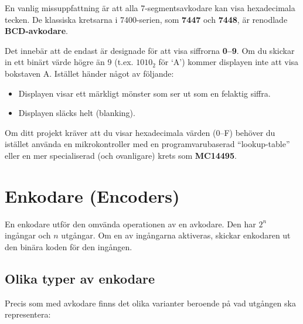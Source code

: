 \documentclass[
  swedish,
  letterpaper,
  oneside,
  openany]{book}
\providecommand{\tightlist}{%
  \setlength{\itemsep}{0pt}\setlength{\parskip}{0pt}}
\begin{document}
\begin{tcolorbox}[enhanced jigsaw, arc=.35mm, bottomrule=.15mm, bottomtitle=1mm, breakable, colback=white, colbacktitle=quarto-callout-warning-color!10!white, colframe=quarto-callout-warning-color-frame, coltitle=black, left=2mm, leftrule=.75mm, opacityback=0, opacitybacktitle=0.6, rightrule=.15mm, title=\textcolor{quarto-callout-warning-color}{\faExclamationTriangle}\hspace{0.5em}{Viktigt: 7447/7448 stöder inte Hexadecimala tal (A--F)}, titlerule=0mm, toprule=.15mm, toptitle=1mm]

En vanlig missuppfattning är att alla 7-segmentsavkodare kan visa
hexadecimala tecken. De klassiska kretsarna i 7400-serien, som
\textbf{7447} och \textbf{7448}, är renodlade \textbf{BCD-avkodare}.

Det innebär att de endast är designade för att visa siffrorna
\textbf{0--9}. Om du skickar in ett binärt värde högre än 9 (t.ex.
\(1010_2\) för `A') kommer displayen inte att visa bokstaven A. Istället
händer något av följande:

\begin{itemize}
\tightlist
\item
  Displayen visar ett märkligt mönster som ser ut som en felaktig
  siffra.
\item
  Displayen släcks helt (blanking).
\end{itemize}

Om ditt projekt kräver att du visar hexadecimala värden (0--F) behöver
du istället använda en mikrokontroller med en programvarubaserad
``lookup-table'' eller en mer specialiserad (och ovanligare) krets som
\textbf{MC14495}.

\end{tcolorbox}

\section{Enkodare (Encoders)}\label{sec-enkodare}

En enkodare utför den omvända operationen av en avkodare. Den har
\(2^n\) ingångar och \(n\) utgångar. Om en av ingångarna aktiveras,
skickar enkodaren ut den binära koden för den ingången.

\subsection{Olika typer av enkodare}\label{olika-typer-av-enkodare}

Precis som med avkodare finns det olika varianter beroende på vad
utgången ska representera:
\end{document}
